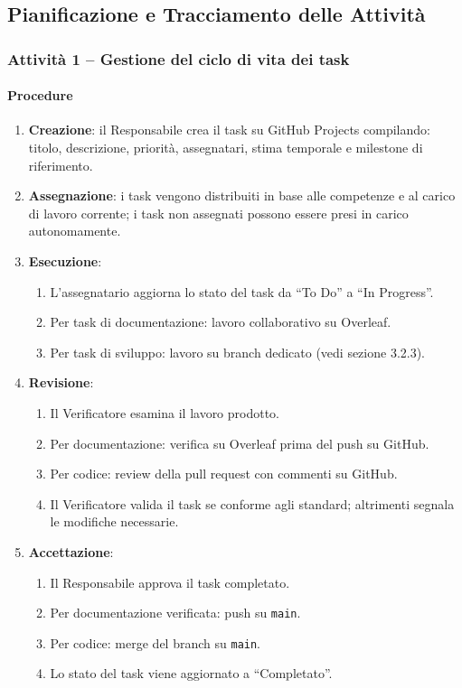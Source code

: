 \documentclass[a4paper, 11pt, oneside]{scrartcl}
\begin{document}
\subsection{Pianificazione e Tracciamento delle Attività}

\subsubsection{Attività 1 – Gestione del ciclo di vita dei task}

\paragraph{Procedure}
\begin{enumerate}
    \item \textbf{Creazione}: il Responsabile crea il task su GitHub Projects compilando: titolo, descrizione, priorità, assegnatari, stima temporale e milestone{\scriptsize{}} di riferimento.
    \item \textbf{Assegnazione}: i task vengono distribuiti in base alle competenze e al carico di lavoro corrente; i task non assegnati possono essere presi in carico autonomamente.
    \item \textbf{Esecuzione}:
    \begin{enumerate}[label=\alph*.]
        \item L'assegnatario aggiorna lo stato del task da ``To Do'' a ``In Progress''.
        \item Per task di documentazione: lavoro collaborativo su Overleaf.
        \item Per task di sviluppo: lavoro su branch dedicato (vedi sezione 3.2.3).
    \end{enumerate}
    \item \textbf{Revisione}:
    \begin{enumerate}[label=\alph*.]
        \item Il Verificatore esamina il lavoro prodotto.
        \item Per documentazione: verifica su Overleaf prima del push su GitHub.
        \item Per codice: review della pull request con commenti su GitHub.
        \item Il Verificatore valida il task se conforme agli standard; altrimenti segnala le modifiche necessarie.
    \end{enumerate}
    \item \textbf{Accettazione}:
    \begin{enumerate}[label=\alph*.]
        \item Il Responsabile approva il task completato.
        \item Per documentazione verificata: push su \texttt{main}.
        \item Per codice: merge del branch su \texttt{main}.
        \item Lo stato del task viene aggiornato a ``Completato''.
    \end{enumerate}
\end{enumerate}
\end{document}
